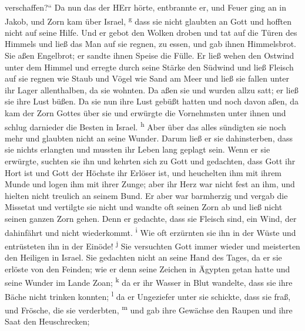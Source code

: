 verschaffen?{}``  Da nun das der HErr hörte, entbrannte
er, und Feuer ging an in Jakob, und Zorn kam über Israel,
\textsuperscript{g}  dass sie nicht glaubten an Gott und
hofften nicht auf seine Hilfe.  Und er gebot den Wolken
droben und tat auf die Türen des Himmels  und ließ das
Man auf sie regnen, zu essen, und gab ihnen Himmelsbrot. 
Sie aßen Engelbrot; er sandte ihnen Speise die Fülle.  Er
ließ wehen den Ostwind unter dem Himmel und erregte durch seine Stärke
den Südwind  und ließ Fleisch auf sie regnen wie Staub
und Vögel wie Sand am Meer  und ließ sie fallen unter ihr
Lager allenthalben, da sie wohnten.  Da aßen sie und
wurden allzu satt; er ließ sie ihre Lust büßen.  Da sie
nun ihre Lust gebüßt hatten und noch davon aßen,  da kam
der Zorn Gottes über sie und erwürgte die Vornehmsten unter ihnen und
schlug darnieder die Besten in Israel. \textsuperscript{h}
 Aber über das alles sündigten sie noch mehr und glaubten
nicht an seine Wunder.  Darum ließ er sie dahinsterben,
dass sie nichts erlangten und mussten ihr Leben lang geplagt sein.
 Wenn er sie erwürgte, suchten sie ihn und kehrten sich
zu Gott  und gedachten, dass Gott ihr Hort ist und Gott
der Höchste ihr Erlöser ist,  und heuchelten ihm mit
ihrem Munde und logen ihm mit ihrer Zunge;  aber ihr Herz
war nicht fest an ihm, und hielten nicht treulich an seinem Bund.
 Er aber war barmherzig und vergab die Missetat und
vertilgte sie nicht und wandte oft seinen Zorn ab und ließ nicht seinen
ganzen Zorn gehen.  Denn er gedachte, dass sie Fleisch
sind, ein Wind, der dahinfährt und nicht wiederkommt.
\textsuperscript{i}  Wie oft erzürnten sie ihn in der
Wüste und entrüsteten ihn in der Einöde! \textsuperscript{j}
 Sie versuchten Gott immer wieder und meisterten den
Heiligen in Israel.  Sie gedachten nicht an seine Hand
des Tages, da er sie erlöste von den Feinden;  wie er
denn seine Zeichen in Ägypten getan hatte und seine Wunder im Lande
Zoan; \textsuperscript{k}  da er ihr Wasser in Blut
wandelte, dass sie ihre Bäche nicht trinken konnten; \textsuperscript{l}
 da er Ungeziefer unter sie schickte, dass sie fraß, und
Frösche, die sie verderbten, \textsuperscript{m}  und gab
ihre Gewächse den Raupen und ihre Saat den Heuschrecken;
